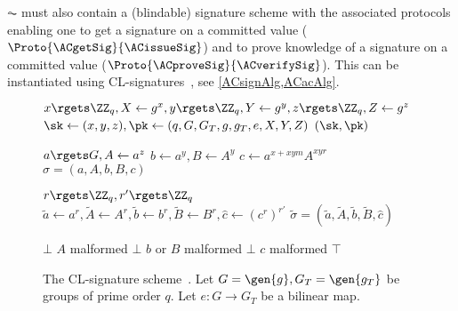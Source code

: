 \(\AC\) must also contain a (blindable) signature scheme with the associated 
protocols enabling one to get a signature on a committed value 
(\(\Proto{\ACgetSig}{\ACissueSig}\)) and to prove knowledge of a signature on a 
committed value (\(\Proto{\ACproveSig}{\ACverifySig}\)).
This can be instantiated using CL-signatures~\cite{CLsignatures}, see 
\cref{ACsignAlg,ACacAlg}.

\begin{figure}
  \small
  \begin{algorithmic}
    \Function{\CLsetup}{}
    \State $x\rgets \ZZ_q, X\gets g^x, y\rgets \ZZ_q, Y\gets g^y, z\rgets 
    \ZZ_q, Z\gets g^z$
    \State $\sk\gets (x,y,z), \pk\gets (q, G, G_T, g, g_T, e, X, Y, Z)$
    \State \Return $(\sk, \pk)$
    \EndFunction

    \State $a\rgets G, A\gets a^z$
    \State $b\gets a^y, B\gets A^y$
    \State $c\gets a^{x+xym} A^{xyr}$
    \State \Return $\sigma = (a, A, b, B, c)$
    \EndFunction

    \State $r\rgets \ZZ_q, r'\rgets \ZZ_q$
    \State $\tilde a\gets a^r, \tilde A\gets A^r,
      \tilde b\gets b^r, \tilde B\gets B^r,
      \hat c\gets (c^r)^{r'}$
    \State \Return $\tilde \sigma = (\tilde a, \tilde A,
      \tilde b, \tilde B, \hat c)$
    \EndFunction

    \State \Return $\bot$
    \Comment $A$ malformed
    \State \Return $\bot$
    \Comment $b$ or $B$ malformed
    \State \Return $\bot$
    \Comment $c$ malformed
    \EndIf
    \State \Return $\top$
    \EndFunction

  \end{algorithmic}
  \caption{\label{ACsignAlg}%
    The CL-signature scheme~\cite{CLsignatures}.
    Let \(G = \gen{g}, G_T = \gen{g_T}\) be groups of prime order \(q\).
    Let \(e\colon G\to G_T\) be a bilinear map.
  }
\end{figure}

